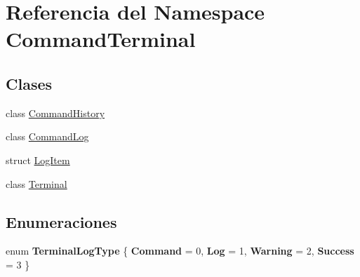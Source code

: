 \hypertarget{namespace_command_terminal}{}\section{Referencia del Namespace Command\+Terminal}
\label{namespace_command_terminal}
\subsection*{Clases}
\begin{DoxyCompactItemize}
\item 
class \mbox{\hyperlink{class_command_terminal_1_1_command_history}{Command\+History}}
\item 
class \mbox{\hyperlink{class_command_terminal_1_1_command_log}{Command\+Log}}
\item 
struct \mbox{\hyperlink{struct_command_terminal_1_1_log_item}{Log\+Item}}
\item 
class \mbox{\hyperlink{class_command_terminal_1_1_terminal}{Terminal}}
\end{DoxyCompactItemize}
\subsection*{Enumeraciones}
\begin{DoxyCompactItemize}
\item 
\mbox{\label{namespace_command_terminal_a2d770625a48fbc7fef1b847bad584a62}} 
enum {\bfseries Terminal\+Log\+Type} \{ {\bfseries Command} = 0, 
{\bfseries Log} = 1, 
{\bfseries Warning} = 2, 
{\bfseries Success} = 3
 \}
\end{DoxyCompactItemize}
